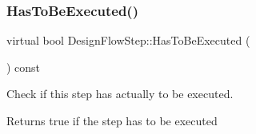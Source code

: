 \subsubsection{\texorpdfstring{Has\+To\+Be\+Executed()}{HasToBeExecuted()}}
{\footnotesize\ttfamily virtual bool Design\+Flow\+Step\+::\+Has\+To\+Be\+Executed (\begin{DoxyParamCaption}{ }\end{DoxyParamCaption}) const\hspace{0.3cm}{\ttfamily [pure virtual]}}



Check if this step has actually to be executed. 

\begin{DoxyReturn}{Returns}
true if the step has to be executed 
\end{DoxyReturn}


